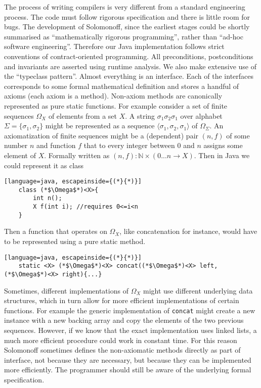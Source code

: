 The process of writing compilers is very different from a standard engineering process. The code must follow rigorous specification and there is little room for bugs. The development of Solomonoff, since the earliest stages could be shortly summarised as ``mathematically rigorous programming'', rather than ``ad-hoc software engineering''. Therefore our Java implementation follows strict conventions of contract-oriented programming. All preconditions, postconditions and invariants are asserted using runtime analysis. We also make extensive use of the  ``typeclass pattern''. Almost everything is an interface. Each of the interfaces corresponds to some formal mathematical definition and stores a handful of axioms (each axiom is a method). Non-axiom methods are canonically represented as pure static functions. 
For example consider a set of finite sequences $\Omega_X$ of elements from a set $X$. A string $\sigma_1\sigma_2\sigma_1$ over alphabet $\Sigma=\{\sigma_1,\sigma_2\}$ might be represented as a sequence $\langle \sigma_1,\sigma_2,\sigma_1\rangle$ of $\Omega_\Sigma$. An axiomatization of finite sequences might be a (dependent) pair $(n, f)$ of some number $n$ and function $f$ that to every integer between $0$ and $n$ assigns some element of $X$. Formally written as $(n, f) : \mathbb{N} \times (0...n \rightarrow X)$. Then in Java we could represent it as class
\begin{lstlisting}[language=java, escapeinside={(*}{*)}]
	class (*$\Omega$*)<X>{
		int n();
		X f(int i); //requires 0<=i<n
	}
\end{lstlisting}
Then a function that operates on $\Omega_X$, like concatenation for instance, would have to be represented using a pure static method.
\begin{lstlisting}[language=java, escapeinside={(*}{*)}]
	static <X> (*$\Omega$*)<X> concat((*$\Omega$*)<X> left, (*$\Omega$*)<X> right){...}
\end{lstlisting}
Sometimes, different implementations of $\Omega_X$ might use different underlying data structures, which in turn allow for more efficient implementations of certain functions. For example the generic implementation of \texttt{concat} might create a new instance with a new backing array and copy the elements of the two previous sequences. However, if we know that the exact implementation uses linked lists, a much more efficient procedure could work in constant time.  For this reason Solomonoff sometimes defines the non-axiomatic methods directly as part of interface, not because they are necessary, but because they can be implemented more efficiently. The programmer should still be aware of the underlying formal specification. 

